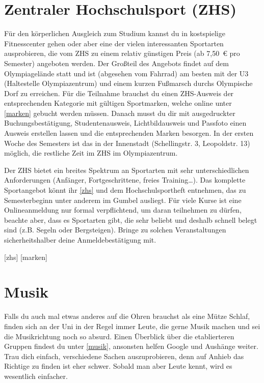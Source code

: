 \section{Zentraler Hochschulsport (ZHS)}

Für den körperlichen Ausgleich zum Studium kannst du in kostspielige
Fitnesscenter gehen oder aber eine der vielen interessanten Sportarten
ausprobieren, die vom ZHS zu einem relativ günstigen Preis (ab 7,50~€ pro
Semester) angeboten werden. Der Großteil des Angebots findet auf dem
Olympiagelände statt und ist (abgesehen vom Fahrrad) am besten mit der U3
(Haltestelle Olympiazentrum) und einem kurzen Fußmarsch durchs Olympische Dorf
zu erreichen. Für die Teilnahme brauchst du einen ZHS-Ausweis der
entsprechenden Kategorie mit gültigen Sportmarken, welche online unter
\ref{marken} gebucht werden müssen. Danach musst du dir mit ausgedruckter
Buchungsbestätigung, Studentenausweis, Lichtbildausweis und Passfoto einen
Ausweis erstellen lassen und die entsprechenden Marken besorgen. In der ersten
Woche des Semesters ist das in der Innenstadt (Schellingstr. 3, Leopoldstr. 13)
möglich, die restliche Zeit im ZHS im Olympiazentrum. 

Der ZHS bietet ein breites Spektrum an Sportarten mit sehr unterschiedlichen
Anforderungen (Anfänger, Fortgeschrittene, freies Training\ldots). Das
komplette Sportangebot könnt ihr \ref{zhs} und dem Hochschulsportheft
entnehmen, das zu Semesterbeginn unter anderem im Gumbel ausliegt. Für viele
Kurse ist eine Onlineanmeldung nur formal verpflichtend, um daran teilnehmen zu
dürfen, beachte aber, dass es Sportarten gibt, die sehr beliebt und deshalb
schnell belegt sind (z.B. Segeln oder Bergsteigen). Bringe zu solchen
Veranstaltungen sicherheitshalber deine Anmeldebestätigung mit.

\begin{urlList}
	[zhs]
	[marken]
\end{urlList}

\section{Musik}
Falls du auch mal etwas anderes auf die Ohren brauchst als eine
Mütze Schlaf, finden sich an der Uni in der Regel immer Leute, die gerne Musik
machen und sei die Musikrichtung noch so absurd. Einen Überblick über die
etablierteren Gruppen findest du unter \ref{musik}, ansonsten helfen Google und
Aushänge weiter. Trau dich einfach, verschiedene Sachen auszuprobieren, denn
auf Anhieb das Richtige zu finden ist eher schwer. Sobald man aber Leute kennt,
wird es wesentlich einfacher.

